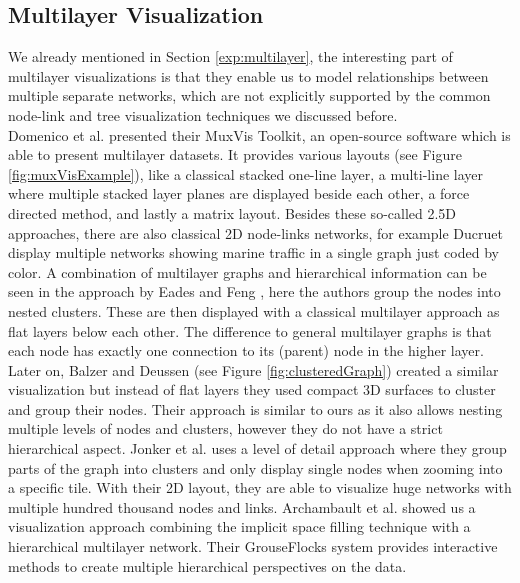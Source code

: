 \subsection{Multilayer Visualization}
We already mentioned in Section \ref{exp:multilayer}, the interesting part of multilayer visualizations is that they enable us to model relationships between multiple separate networks, which are not explicitly supported by the common node-link and tree visualization techniques we discussed before.\\
Domenico et al. \cite{de_domenico_muxviz_2015} presented their MuxVis Toolkit, an open-source software which is able to present multilayer datasets. It provides various layouts (see Figure \ref{fig:muxVisExample}), like a classical stacked one-line layer, a multi-line layer where multiple stacked layer planes are displayed beside each other, a force directed method, and lastly a matrix layout. Besides these so-called 2.5D approaches, there are also classical 2D node-links networks, for example Ducruet \cite{ducruet_multilayer_nodate} display multiple networks showing marine traffic in a single graph just coded by color. 
A combination of multilayer graphs and hierarchical information can be seen in the approach by Eades and Feng \cite{eades_multilevel_1997}, here the authors group the nodes into nested clusters. These are then displayed with a classical multilayer approach as flat layers below each other. The difference to general multilayer graphs is that each node has exactly one connection to its (parent) node in the higher layer. 
Later on, Balzer and Deussen \cite{balzer_level--detail_2007} (see Figure \ref{fig:clusteredGraph}) created a similar visualization but instead of flat layers they used compact 3D surfaces to cluster and group their nodes. Their approach is similar to ours as it also allows nesting multiple levels of nodes and clusters, however they do not have a strict hierarchical aspect. 
Jonker et al. \cite{jonker_graph_2017} uses a level of detail approach where they group parts of the graph into clusters and only display single nodes when zooming into a specific tile. With their 2D layout, they are able to visualize huge networks with multiple hundred thousand nodes and links.
Archambault et al. \cite{archambault_grouseflocks_2008} showed us a visualization approach combining the implicit space filling technique with a hierarchical multilayer network. Their GrouseFlocks system provides  interactive methods to create multiple hierarchical perspectives on the data.  

